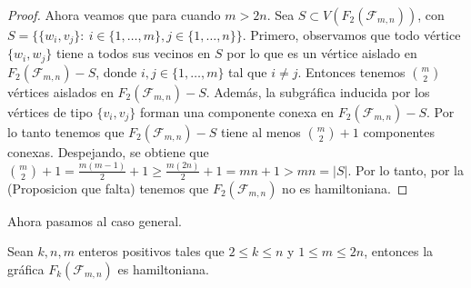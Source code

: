 \begin{proof}
    Ahora veamos que para cuando $m>2n$. Sea $S \subset V(F_2(\mathcal{F}_{m,n}))$, con
    $S=\{\{w_i,v_j\} \colon\ i \in \{1,\dots,m\},j\in\{1,\dots,n\}\}$. Primero,
    observamos que todo v\'ertice $\{w_i,w_j\}$ tiene a todos sus vecinos en $S$
    por lo que es un v\'ertice aislado en $F_2(\mathcal{F}_{m,n})-S$, donde $i,j \in
    \{1,\dots,m\}$ tal que $i \neq j$. Entonces tenemos $\binom{m}{2}$
    v\'ertices aislados en $F_2(\mathcal{F}_{m,n})-S$. Adem\'as, la subgr\'afica inducida
    por los v\'ertices de tipo $\{v_i,v_j\}$ forman una componente conexa en
    $F_2(\mathcal{F}_{m,n})-S$. Por lo tanto tenemos que $F_2(\mathcal{F}_{m,n})-S$ tiene al menos
    $\binom{m}{2} + 1$ componentes conexas. Despejando, se obtiene que
    $\binom{m}{2} + 1 = \frac{m(m-1)}{2} + 1 \geq \frac{m(2n)}{2} + 1 = mn + 1 >
    mn = |S|$. Por lo tanto, por la (Proposicion que falta) tenemos que
    $F_2(\mathcal{F}_{m,n})$ no es hamiltoniana.

\end{proof}

Ahora pasamos al caso general.

    \begin{teorema}
        Sean $k, n, m$ enteros positivos tales que $2 \leq k \leq n$ y $1 \leq m
        \leq 2n$, entonces la gr\'afica $F_k(\mathcal{F}_{m,n})$ es hamiltoniana.
    \end{teorema}

